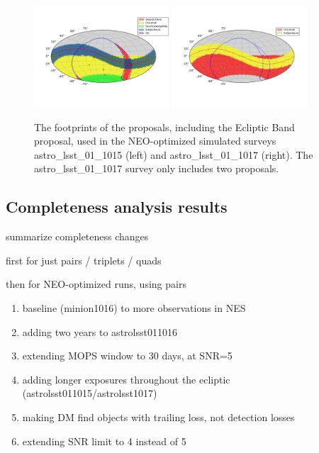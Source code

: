 \begin{figure}
\centering
\includegraphics[width=0.45\textwidth]{figures/astro_lsst_01_1015_proposal_footprint}
\includegraphics[width=0.45\textwidth]{figures/astro_lsst_01_1017_proposal_footprint}
\caption{The footprints of the proposals, including the Ecliptic Band proposal, used in the NEO-optimized simulated surveys astro\_lsst\_01\_1015 (left) and astro\_lsst\_01\_1017 (right). The astro\_lsst\_01\_1017 survey only includes two proposals.
\label{fig:neo_footprints}}
\end{figure}

\subsection{Completeness analysis results}

summarize completeness changes 

first for just pairs / triplets / quads

then for NEO-optimized runs, using pairs

\begin{enumerate}
\item baseline (minion1016) to more observations in NES
\item adding two years to astrolsst011016
\item extending MOPS window to 30 days, at SNR=5
\item adding longer exposures throughout the ecliptic (astrolsst011015/astrolsst1017)
\item making DM find objects with trailing loss, not detection losses
\item extending SNR limit to 4 instead of 5
\end{enumerate}

